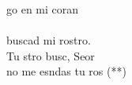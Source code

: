 \begin{cancion}%
	go en mi coran \\
	\jump\\
buscad mi rostro.\\
	Tu stro busc, Seor \\
	no me esndas tu ros (**)\\
\end{cancion}%
